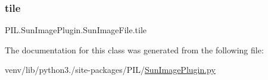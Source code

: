 \mbox{\label{classPIL_1_1SunImagePlugin_1_1SunImageFile_ad6cb00740c730ebf22506e4525b8eca2}} 
\subsubsection{\texorpdfstring{tile}{tile}}
{\footnotesize\ttfamily P\+I\+L.\+Sun\+Image\+Plugin.\+Sun\+Image\+File.\+tile}



The documentation for this class was generated from the following file\+:\begin{DoxyCompactItemize}
\item 
venv/lib/python3./site-\/packages/\+P\+I\+L/\hyperlink{SunImagePlugin_8py}{Sun\+Image\+Plugin.\+py}\end{DoxyCompactItemize}

